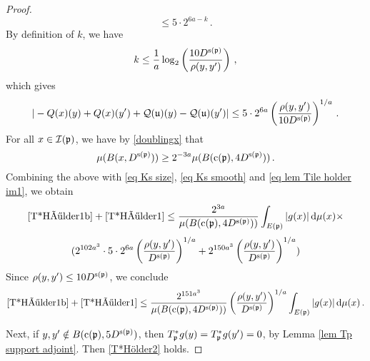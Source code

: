 {\begin{proof}
        $$
            \le 5 \cdot 2^{6a - k}\,.
        $$
        By definition of $k$, we have
        $$
            k \le \frac{1}{a} \log_2\left(\frac{10 D^{\mathrm{s}(\mathfrak p)}}{\rho(y,y')}\right)\,,
        $$
        which gives
        \begin{equation}
            \label{eq lem Tile holder im1}
             |-{Q}(x)(y) + {Q}(x)(y') + \mathcal{Q}(\mathfrak u)(y) - \mathcal{Q}(\mathfrak u)(y')| \le 5 \cdot 2^{6a} \left(\frac{\rho(y,y')}{10 D^{\mathrm{s}(\mathfrak p)}}\right)^{1/a}\,.
        \end{equation}
        For all $x \in \mathcal{I}(\mathfrak p)$, we have by \eqref{doublingx} that
        $$
            \mu(B(x, D^{\mathrm{s}(\mathfrak p)})) \ge 2^{-3a} \mu(B(\mathrm{c}(\mathfrak p), 4D^{\mathrm{s}(\mathfrak p)}))\,.
        $$
        Combining the above with \eqref{eq Ks size}, \eqref{eq Ks smooth} and \eqref{eq lem Tile holder im1},
        we obtain
        $$
            \eqref{T*Hölder1b}+\eqref{T*Hölder1} \le \frac{2^{3a}}{\mu(B(\mathrm{c}(\mathfrak p), 4D^{\mathrm{s}(\mathfrak p)}))} \int_{E(\mathfrak p)}|g(x)| \, \mathrm{d}\mu(x) \times
        $$
        $$
            (2^{102a^3} \cdot 5 \cdot 2^{6a} \left(\frac{\rho(y,y')}{ D^{\mathrm{s}(\mathfrak p)}}\right)^{1/a} + 2^{150a^3} \left(\frac{\rho(y,y')}{D^{\mathrm{s}(\mathfrak p)}}\right)^{1/a})
        $$
        Since $\rho(y,y') \le 10 D^{\mathrm{s}(\mathfrak p)}$, we conclude
        $$
            \eqref{T*Hölder1b}+\eqref{T*Hölder1} \le \frac{2^{151a^3}}{\mu(B(\mathrm{c}(\mathfrak p), 4D^{\mathrm{s}(\mathfrak p)}))} \left(\frac{\rho(y,y')}{D^{\mathrm{s}(\mathfrak p)}}\right)^{1/a} \int_{E(\mathfrak p)}|g(x)| \, \mathrm{d}\mu(x)\,.
        $$

        Next, if $y,y' \notin B(\mathrm{c}(\mathfrak p), 5D^{\mathrm{s}(\mathfrak p)})$, then $T_{\mathfrak p}^*g(y) = T_{\mathfrak p}^*g(y') = 0$, by Lemma \ref{lem Tp support adjoint}. Then \eqref{T*Hölder2} holds.


\end{proof}}
